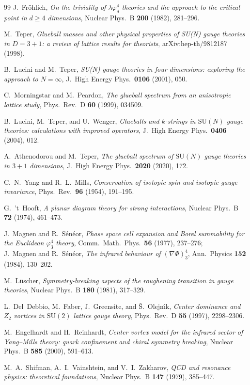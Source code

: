 \documentclass[11pt]{article}
\begin{document}
\begin{thebibliography}{99}
J.~Fr\"ohlich,
\textit{On the triviality of $\lambda\varphi_d^4$ theories and the
approach to the critical point in $d \geq 4$ dimensions},
Nuclear Phys.\ B \textbf{200} (1982), 281--296.

M.~Teper,
\textit{Glueball masses and other physical properties of SU(N) gauge
theories in $D = 3+1$: a review of lattice results for theorists},
arXiv:hep-th/9812187 (1998).

B.~Lucini and M.~Teper,
\textit{SU(N) gauge theories in four dimensions: exploring the
approach to $N = \infty$},
J.\ High Energy Phys.\ \textbf{0106} (2001), 050.

C.~Morningstar and M.~Peardon,
\textit{The glueball spectrum from an anisotropic lattice study},
Phys.\ Rev.\ D \textbf{60} (1999), 034509.

B.~Lucini, M.~Teper, and U.~Wenger,
\textit{Glueballs and $k$-strings in $\mathrm{SU}(N)$ gauge theories:
calculations with improved operators},
J.\ High Energy Phys.\ \textbf{0406} (2004), 012.

A.~Athenodorou and M.~Teper,
\textit{The glueball spectrum of $\mathrm{SU}(N)$ gauge theories in
$3+1$ dimensions},
J.\ High Energy Phys.\ \textbf{2020} (2020), 172.

C.~N.~Yang and R.~L.~Mills,
\textit{Conservation of isotopic spin and isotopic gauge invariance},
Phys.\ Rev.\ \textbf{96} (1954), 191--195.

G.~'t~Hooft,
\textit{A planar diagram theory for strong interactions},
Nuclear Phys.\ B \textbf{72} (1974), 461--473.

J.~Magnen and R.~S\'en\'eor,
\textit{Phase space cell expansion and Borel summability for the
Euclidean $\varphi_3^4$ theory},
Comm.\ Math.\ Phys.\ \textbf{56} (1977), 237--276;\\
J.~Magnen and R.~S\'en\'eor,
\textit{The infrared behaviour of $(\nabla\Phi)^4_3$},
Ann.\ Physics \textbf{152} (1984), 130--202.

M.~L\"uscher,
\textit{Symmetry-breaking aspects of the roughening transition in
gauge theories},
Nuclear Phys.\ B \textbf{180} (1981), 317--329.

L.~Del~Debbio, M.~Faber, J.~Greensite, and \v{S}.~Olejn\'\i k,
\textit{Center dominance and $Z_2$ vortices in $\mathrm{SU}(2)$
lattice gauge theory},
Phys.\ Rev.\ D \textbf{55} (1997), 2298--2306.

M.~Engelhardt and H.~Reinhardt,
\textit{Center vortex model for the infrared sector of Yang--Mills
theory: quark confinement and chiral symmetry breaking},
Nuclear Phys.\ B \textbf{585} (2000), 591--613.

M.~A.~Shifman, A.~I.~Vainshtein, and V.~I.~Zakharov,
\textit{QCD and resonance physics: theoretical foundations},
Nuclear Phys.\ B \textbf{147} (1979), 385--447.

\end{thebibliography}
\end{document}
